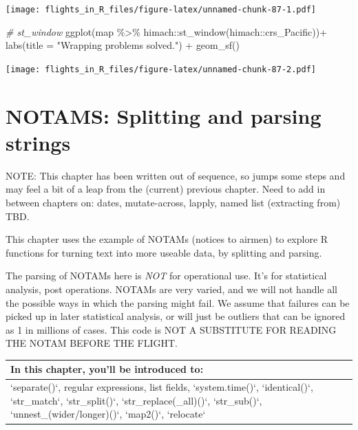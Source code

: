 \documentclass[
]{book}
\newenvironment{Shaded}{\begin{snugshade}}{\end{snugshade}}
\newcommand{\AttributeTok}[1]{\textcolor[rgb]{0.77,0.63,0.00}{#1}}
\newcommand{\CommentTok}[1]{\textcolor[rgb]{0.56,0.35,0.01}{\textit{#1}}}
\newcommand{\FunctionTok}[1]{\textcolor[rgb]{0.00,0.00,0.00}{#1}}
\newcommand{\NormalTok}[1]{#1}
\newcommand{\SpecialCharTok}[1]{\textcolor[rgb]{0.00,0.00,0.00}{#1}}
\newcommand{\StringTok}[1]{\textcolor[rgb]{0.31,0.60,0.02}{#1}}
\begin{document}
\texttt{[image: flights\_in\_R\_files/figure-latex/unnamed-chunk-87-1.pdf]}

\begin{Shaded}
\begin{Highlighting}[]
\CommentTok{\# st\_window }
\FunctionTok{ggplot}\NormalTok{(map }\SpecialCharTok{\%\textgreater{}\%}\NormalTok{ himach}\SpecialCharTok{::}\FunctionTok{st\_window}\NormalTok{(himach}\SpecialCharTok{::}\NormalTok{crs\_Pacific))}\SpecialCharTok{+}
  \FunctionTok{labs}\NormalTok{(}\AttributeTok{title =} \StringTok{"Wrapping problems solved."}\NormalTok{) }\SpecialCharTok{+}
  \FunctionTok{geom\_sf}\NormalTok{()}
\end{Highlighting}
\end{Shaded}

\texttt{[image: flights\_in\_R\_files/figure-latex/unnamed-chunk-87-2.pdf]}

\hypertarget{splitparse}{%
\chapter{NOTAMS: Splitting and parsing strings}\label{splitparse}}

NOTE: This chapter has been written out of sequence, so jumps some steps and may feel a bit of a leap from the (current) previous chapter. Need to add in between chapters on: dates, mutate-across, lapply, named list (extracting from) TBD.

This chapter uses the example of NOTAMs (notices to airmen) to explore R functions for turning text into more useable data, by splitting and parsing.

The parsing of NOTAMs here is \emph{NOT} for operational use. It's for statistical analysis, post operations. NOTAMs are very varied, and we will not handle all the possible ways in which the parsing might fail. We assume that failures can be picked up in later statistical analysis, or will just be outliers that can be ignored as 1 in millions of cases. This code is NOT A SUBSTITUTE FOR READING THE NOTAM BEFORE THE FLIGHT.

\begin{tabular}{l}
\hline
In this chapter, you'll be introduced to:\\
\hline
`separate()`, regular expressions, list fields, `system.time()`, `identical()`, `str\_match`, `str\_split()`, `str\_replace(\_all)()`, `str\_sub()`, `unnest\_(wider/longer)()`, `map2()`, `relocate`\\
\hline
\end{tabular}
\end{document}
